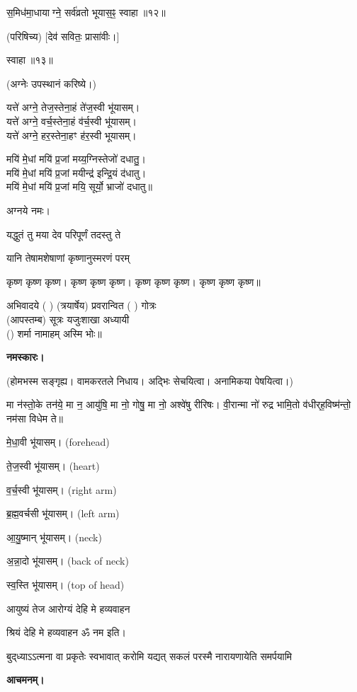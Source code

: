 स॒मिध॑मा॒धायाग्ने॒ सर्व॑व्रतो भूयास॒ꣴ॒ स्वाहा॥१२॥

(परिषिच्य) [देव॑ सवितः॒ प्रासा॑वीः।]

स्वाहा॥१३॥


(अग्नेः उपस्थानं करिष्ये।)

यत्ते॑ अग्ने॒ तेज॒स्तेना॒हं ते॑ज॒स्वी भू॑यासम्।\\
यत्ते॑ अग्ने॒ वर्च॒स्तेना॒हं व॑र्च॒स्वी भू॑यासम्।\\
यत्ते॑ अग्ने॒ हर॒स्तेना॒हꣳ ह॑र॒स्वी भूयासम्।

मयि॑ मे॒धां मयि॑ प्र॒जां मय्य॒ग्निस्तेजो॑ दधातु॒।\\
मयि॑ मे॒धां मयि॑ प्र॒जां मयीन्द्र॑ इन्द्रि॒यं द॑धातु।\\
मयि॑ मे॒धां मयि॑ प्र॒जां मयि॒ सूर्यो॒ भ्राजो॑ दधातु॥
 
अग्नये नमः। 

{यद्धुतं तु मया देव परिपूर्णं तदस्तु ते}

{यानि तेषामशेषाणां कृष्णानुस्मरणं परम्}

कृष्ण कृष्ण कृष्ण। कृष्ण कृष्ण कृष्ण। कृष्ण कृष्ण कृष्ण। कृष्ण कृष्ण कृष्ण॥

अभिवादये ( ) (त्रयार्षेय) प्रवरान्वित ( ) गोत्रः\\
(आपस्तम्ब) सूत्रः यजुःशाखा अध्यायी\\
() शर्मा नामाहम् अस्मि भोः॥

\textbf{नमस्कारः।}



(होमभस्म सङ्गृह्य। वामकरतले निधाय। अद्भिः सेचयित्वा। अनामिकया पेषयित्वा।)

 मा न॑स्तो॒के तन॑ये॒ मा न॒ आयु॑षि॒ मा नो॒ गोषु॒ मा नो॒ अश्वे॑षु रीरिषः। वी॒रान्मा नो॑ रुद्र भामि॒तो व॑धीर्‌ह॒विष्म॑न्तो॒ नम॑सा विधेम ते॥
 
 मे॒धा॒वी भू॑यासम्। (forehead)
 
 ते॒ज॒स्वी भू॑यासम्। (heart)
 
 व॒र्च॒स्वी भू॑यासम्। (right arm)
 
 ब्र॒ह्म॒वर्चसी भू॑यासम्। (left arm)
 
 आ॒यु॒ष्मान् भू॑यासम्। (neck)
 
 अ॒न्ना॒दो भू॑यासम्। (back of neck)
 
 स्व॒स्ति भू॑यासम्। (top of head)
 
 
{आयुष्यं तेज आरोग्यं देहि मे हव्यवाहन}
 
श्रियं देहि मे हव्यवाहन ॐ नम इति।

{बुद्‌ध्याऽऽत्मना वा प्रकृतेः स्वभावात्}
{करोमि यद्यत् सकलं परस्मै}
{नारायणायेति समर्पयामि}

\textbf{आचमनम्।}


 
